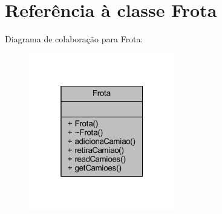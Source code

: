 \hypertarget{class_frota}{}\section{Referência à classe Frota}
\label{class_frota}


Diagrama de colaboração para Frota\+:
\nopagebreak
\begin{figure}[H]
\begin{center}
\leavevmode
\includegraphics[width=181pt]{class_frota__coll__graph}
\end{center}
\end{figure}
